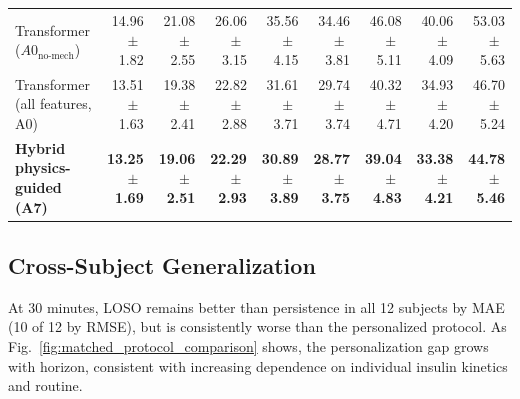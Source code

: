 \documentclass[journal]{IEEEtran}
\begin{document}
\begin{table}[t]
\begin{tabular}{lrrrrrrrr}
Transformer ($A0_{\text{no-mech}}$) & 14.96$\,\pm\,$1.82 & 21.08$\,\pm\,$2.55 & 26.06$\,\pm\,$3.15 & 35.56$\,\pm\,$4.15 & 34.46$\,\pm\,$3.81 & 46.08$\,\pm\,$5.11 & 40.06$\,\pm\,$4.09 & 53.03$\,\pm\,$5.63 \\
Transformer (all features, A0) & 13.51$\,\pm\,$1.63 & 19.38$\,\pm\,$2.41 & 22.82$\,\pm\,$2.88 & 31.61$\,\pm\,$3.71 & 29.74$\,\pm\,$3.74 & 40.32$\,\pm\,$4.71 & 34.93$\,\pm\,$4.20 & 46.70$\,\pm\,$5.24 \\
\textbf{Hybrid physics-guided (A7)} & \textbf{13.25$\,\pm\,$1.69} & \textbf{19.06$\,\pm\,$2.51} & \textbf{22.29$\,\pm\,$2.93} & \textbf{30.89$\,\pm\,$3.89} & \textbf{28.77$\,\pm\,$3.75} & \textbf{39.04$\,\pm\,$4.83} & \textbf{33.38$\,\pm\,$4.21} & \textbf{44.78$\,\pm\,$5.46} \\
\bottomrule
\end{tabular}
\end{table}

\subsection{Cross-Subject Generalization}

At 30 minutes, LOSO remains better than persistence in all 12 subjects by MAE (10 of 12 by RMSE), but is consistently worse than the personalized protocol. As Fig.~\ref{fig:matched_protocol_comparison} shows, the personalization gap grows with horizon, consistent with increasing dependence on individual insulin kinetics and routine.

\losotable
{}\of\maetable \global\let\persA=\pgfplotsretval
{}\of\maetable \global\let\persB=\pgfplotsretval
{}\of\maetable \global\let\persC=\pgfplotsretval
{}\of\maetable \global\let\persD=\pgfplotsretval
{}\of\maetable \global\let\persoA=\pgfplotsretval
{}\of\maetable \global\let\persoB=\pgfplotsretval
{}\of\maetable \global\let\persoC=\pgfplotsretval
{}\of\maetable \global\let\persoD=\pgfplotsretval
{}\of\losotable \global\let\losoA=\pgfplotsretval
{}\of\losotable \global\let\losoB=\pgfplotsretval
{}\of\losotable \global\let\losoC=\pgfplotsretval
{}\of\losotable \global\let\losoD=\pgfplotsretval
\end{document}
